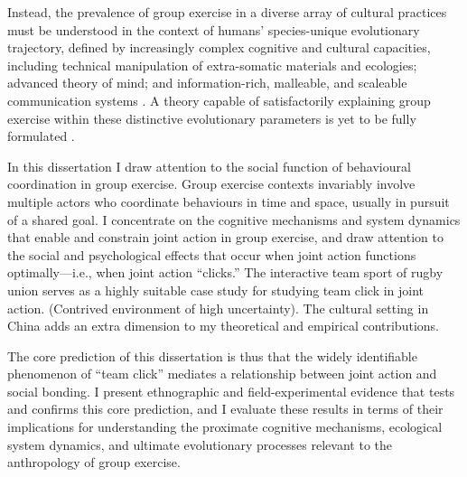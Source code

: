 Instead, the prevalence of group exercise in a diverse array of cultural practices must be understood in the context of humans' species-unique evolutionary trajectory, defined by increasingly complex cognitive and cultural capacities, including technical manipulation of extra-somatic materials and ecologies; advanced theory of mind; and information-rich, malleable, and scaleable communication systems \citep{Fuentes2016}.  A theory capable of satisfactorily explaining group exercise within these distinctive evolutionary parameters is yet to be fully formulated \citep{Cohen2017}.

In this dissertation I draw attention to the social function of behavioural coordination in group exercise.  Group exercise contexts invariably involve multiple actors who coordinate behaviours in time and space, usually in pursuit of a shared goal.  I concentrate on the cognitive mechanisms and system dynamics that enable and constrain joint action in group exercise, and draw attention to the social and psychological effects that occur when joint action functions optimally---i.e., when joint action ``clicks.''
The interactive team sport of rugby union serves as a highly suitable case study for studying team click in joint action.  (Contrived environment of high uncertainty). The cultural setting in China adds an extra dimension to my theoretical and empirical contributions.


The core prediction of this dissertation is thus that the widely identifiable phenomenon of ``team click'' mediates a relationship between joint action and social bonding. I present ethnographic and field-experimental evidence that tests and confirms this core prediction, and I evaluate these results in terms of their implications for understanding the proximate cognitive mechanisms, ecological system dynamics, and ultimate evolutionary processes relevant to the anthropology of group exercise.





